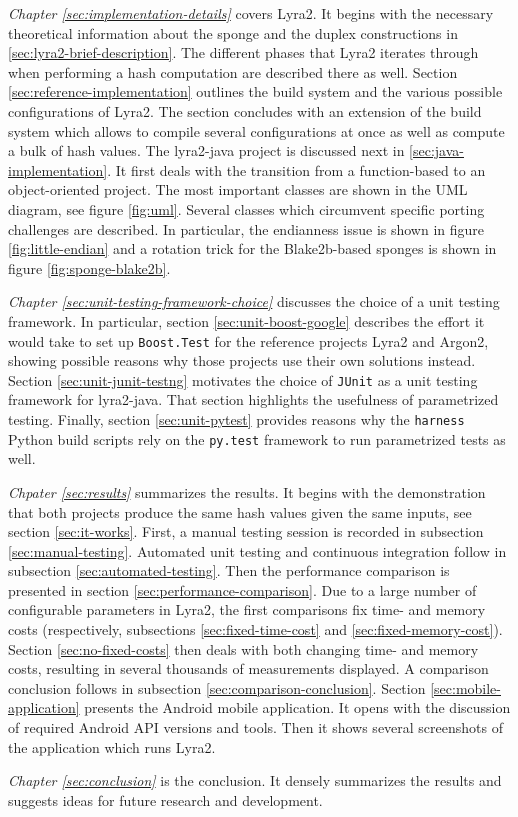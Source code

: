 \emph{Chapter \ref{sec:implementation-details}} covers Lyra2. It begins with the necessary theoretical information about the sponge and the duplex constructions in \ref{sec:lyra2-brief-description}. The different phases that Lyra2 iterates through when performing a hash computation are described there as well. Section \ref{sec:reference-implementation} outlines the build system and the various possible configurations of Lyra2. The section concludes with an extension of the build system which allows to compile several configurations at once as well as compute a bulk of hash values. The lyra2-java project is discussed next in \ref{sec:java-implementation}. It first deals with the transition from a function-based to an object-oriented project. The most important classes are shown in the UML diagram, see figure \ref{fig:uml}. Several classes which circumvent specific porting challenges are described. In particular, the endianness issue is shown in figure \ref{fig:little-endian} and a rotation trick for the Blake2b-based sponges is shown in figure \ref{fig:sponge-blake2b}.

\emph{Chapter \ref{sec:unit-testing-framework-choice}} discusses the choice of a unit testing framework. In particular, section \ref{sec:unit-boost-google} describes the effort it would take to set up \texttt{Boost.Test} for the reference projects Lyra2 and Argon2, showing possible reasons why those projects use their own solutions instead. Section \ref{sec:unit-junit-testng} motivates the choice of \texttt{JUnit} as a unit testing framework for lyra2-java. That section highlights the usefulness of parametrized testing. Finally, section \ref{sec:unit-pytest} provides reasons why the \texttt{harness} Python build scripts rely on the \texttt{py.test} framework to run parametrized tests as well.

\emph{Chpater \ref{sec:results}} summarizes the results. It begins with the demonstration that both projects produce the same hash values given the same inputs, see section \ref{sec:it-works}. First, a manual testing session is recorded in subsection \ref{sec:manual-testing}. Automated unit testing and continuous integration follow in subsection \ref{sec:automated-testing}. Then the performance comparison is presented in section \ref{sec:performance-comparison}. Due to a large number of configurable parameters in Lyra2, the first comparisons fix time- and memory costs (respectively, subsections \ref{sec:fixed-time-cost} and \ref{sec:fixed-memory-cost}). Section \ref{sec:no-fixed-costs} then deals with both changing time- and memory costs, resulting in several thousands of measurements displayed. A comparison conclusion follows in subsection \ref{sec:comparison-conclusion}. Section \ref{sec:mobile-application} presents the Android mobile application. It opens with the discussion of required Android API versions and tools. Then it shows several screenshots of the application which runs Lyra2.

\emph{Chapter \ref{sec:conclusion}} is the conclusion. It densely summarizes the results and suggests ideas for future research and development.
